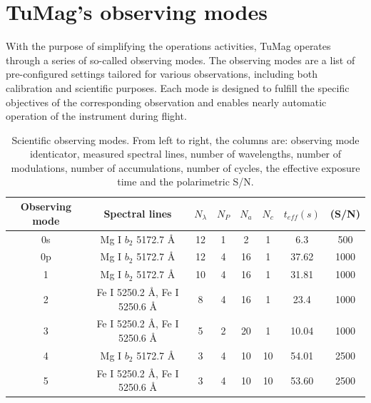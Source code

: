 \section{TuMag's observing modes}

With the purpose of simplifying the operations activities, TuMag operates through a series of so-called observing modes. The observing modes are a list of pre-configured settings tailored for various observations, including both calibration and scientific purposes. Each mode is designed to fulfill the specific objectives of the corresponding observation and enables nearly automatic operation of the instrument during flight.

\begin{table}
    \centering
   \begin{tabular}{cccccccc}
    \hline
    \hline
    Observing mode & Spectral lines  & $N_\lambda$ & $N_P$ & $N_a$& $N_c$ & $t_{eff} (s)$ & (S/N) \\
    \hline
    0s & Mg I $b_2$ 5172.7 \r{A} & 12 & 1 & 2 & 1 & 6.3 & 500\\ 
    0p & Mg I $b_2$ 5172.7 \r{A} & 12 & 4 & 16 & 1 & 37.62 & 1000\\
    1  & Mg I $b_2$ 5172.7 \r{A} &  10 & 4 & 16 & 1 & 31.81 & 1000\\
    2  & Fe I 5250.2 \r{A}, Fe I 5250.6 \r{A} &  8 & 4 & 16 & 1 & 23.4 & 1000\\
    3  & Fe I 5250.2 \r{A}, Fe I 5250.6 \r{A} & 5 & 2 & 20 & 1 & 10.04 & 1000\\
    4  & Mg I $b_2$ 5172.7 \r{A} & 3 & 4 & 10 & 10 & 54.01 & 2500\\
    5  & Fe I 5250.2 \r{A}, Fe I 5250.6 \r{A} & 3 & 4 & 10 & 10 & 53.60 & 2500\\ 
    \hline
    \hline
    \end{tabular}
    \caption{Scientific observing modes. From left to right, the columns are: observing mode identicator, measured spectral lines, number of wavelengths, number of modulations, number of accumulations, number of cycles, the effective exposure time and the polarimetric S/N.}
    \label{table: scientific observing modes}
\end{table}

